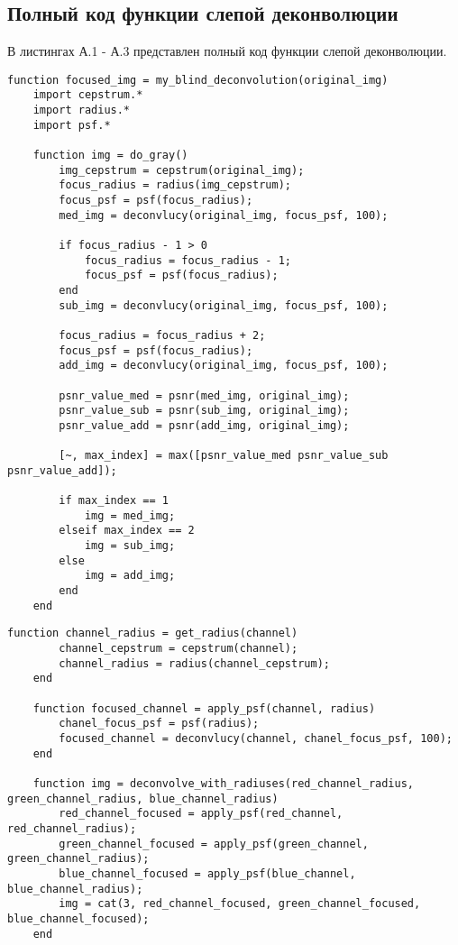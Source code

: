 \begin{appendices}
\chapter{Полный код функции слепой деконволюции}

В листингах А.1 - А.3 представлен полный код функции слепой деконволюции.

\begin{lstlisting}[caption={Функция слепой деконволюции}]
function focused_img = my_blind_deconvolution(original_img)
	import cepstrum.*
	import radius.*
	import psf.*
	
	function img = do_gray()
		img_cepstrum = cepstrum(original_img);
		focus_radius = radius(img_cepstrum);
		focus_psf = psf(focus_radius);
		med_img = deconvlucy(original_img, focus_psf, 100);
		
		if focus_radius - 1 > 0
			focus_radius = focus_radius - 1;
			focus_psf = psf(focus_radius);
		end
		sub_img = deconvlucy(original_img, focus_psf, 100);
		
		focus_radius = focus_radius + 2;
		focus_psf = psf(focus_radius);
		add_img = deconvlucy(original_img, focus_psf, 100);
		
		psnr_value_med = psnr(med_img, original_img);
		psnr_value_sub = psnr(sub_img, original_img);
		psnr_value_add = psnr(add_img, original_img);
		
		[~, max_index] = max([psnr_value_med psnr_value_sub psnr_value_add]);
		
		if max_index == 1
			img = med_img;
		elseif max_index == 2
			img = sub_img;
		else
			img = add_img;
		end
	end	
\end{lstlisting}
\clearpage
\begin{lstlisting}[caption={Функция слепой деконволюции (продолжение)}]
	function channel_radius = get_radius(channel)
		channel_cepstrum = cepstrum(channel);
		channel_radius = radius(channel_cepstrum);
	end
 
	function focused_channel = apply_psf(channel, radius)
		chanel_focus_psf = psf(radius);
		focused_channel = deconvlucy(channel, chanel_focus_psf, 100);
	end
	
	function img = deconvolve_with_radiuses(red_channel_radius, green_channel_radius, blue_channel_radius)
		red_channel_focused = apply_psf(red_channel, red_channel_radius);
		green_channel_focused = apply_psf(green_channel, green_channel_radius);
		blue_channel_focused = apply_psf(blue_channel, blue_channel_radius);
		img = cat(3, red_channel_focused, green_channel_focused, blue_channel_focused);
	end
	

\end{lstlisting}
\end{appendices}
